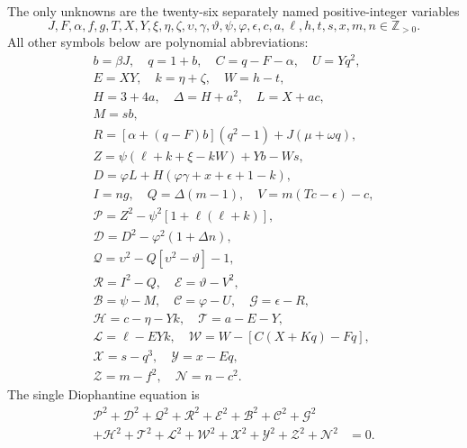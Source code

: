 The only unknowns are the twenty-six separately named positive-integer variables
\[
J,F,\alpha,f,g,T,X,Y,\xi,\eta,\zeta,\upsilon,\gamma,\vartheta,\psi,\varphi,\epsilon,c,a,\ell,h,t,s,x,m,n\in\mathbb Z_{>0}.
\]
All other symbols below are polynomial abbreviations:
\[
\begin{gathered}
b=\beta J,\quad q=1+b,\quad C=q-F-\alpha,\quad U=Yq^2,\\
E=XY,\quad k=\eta+\zeta,\quad W=h-t,\\
H=3+4a,\quad\Delta=H+a^2,\quad L=X+ac,\\
M=sb,\\
R=[\alpha+(q-F)b](q^2-1)+J(\mu+\omega q),\\
Z=\psi(\ell+k+\xi-kW)+Yb-Ws,\\
D=\varphi L+H(\varphi\gamma+x+\epsilon+1-k),\\
I=ng,\quad Q=\Delta(m-1),\quad V=m(Tc-\epsilon)-c,\\
\mathcal{P}=Z^2-\psi^2[1+\ell(\ell+k)],\\
\mathcal{D}=D^2-\varphi^2(1+\Delta n),\\
\mathcal{Q}=\upsilon^2-Q[\upsilon^2-\vartheta]-1,\\
\mathcal{R}=I^2-Q,\quad \mathcal{E}=\vartheta-V^2,\\
\mathcal{B}=\psi-M,\quad \mathcal{C}=\varphi-U,\quad \mathcal{G}=\epsilon-R,\\
\mathcal{H}=c-\eta-Yk,\quad \mathcal{T}=a-E-Y,\\
\mathcal{L}=\ell-EYk,\quad \mathcal{W}=W-[C(X+Kq)-Fq],\\
\mathcal{X}=s-q^3,\quad \mathcal{Y}=x-Eq,\\
\mathcal{Z}=m-f^2,\quad \mathcal{N}=n-c^2.
\end{gathered}
\]
The single Diophantine equation is
\[
\begin{split}
\mathcal{P}^2+\mathcal{D}^2+\mathcal{Q}^2+\mathcal{R}^2+\mathcal{E}^2+\mathcal{B}^2+\mathcal{C}^2+\mathcal{G}^2 &\\
+\mathcal{H}^2+\mathcal{T}^2+\mathcal{L}^2+\mathcal{W}^2+\mathcal{X}^2+\mathcal{Y}^2+\mathcal{Z}^2+\mathcal{N}^2 &= 0.
\end{split}
\]
